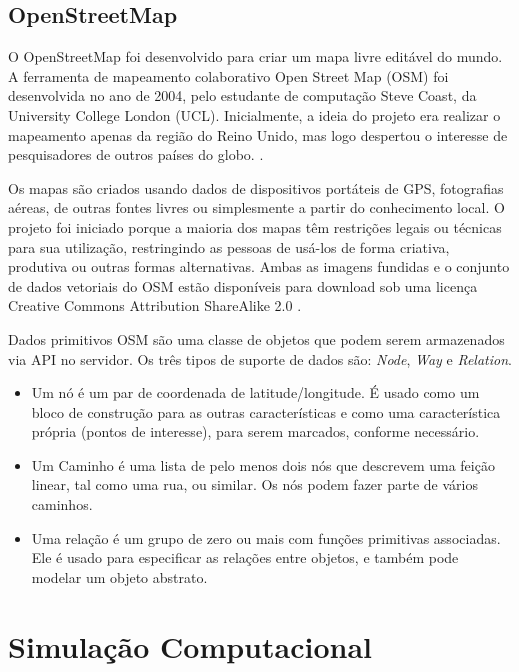 \subsection{OpenStreetMap}

O OpenStreetMap foi desenvolvido para criar um mapa livre editável do mundo. A ferramenta de mapeamento colaborativo Open Street Map (OSM) foi desenvolvida no ano de 2004, pelo estudante de computação Steve Coast, da University College London (UCL). Inicialmente, a ideia do projeto era realizar o mapeamento apenas da região do Reino Unido, mas logo despertou o interesse de pesquisadores de outros países do globo. \cite{ramm2011openstreetmap}.

Os mapas são criados usando dados de dispositivos portáteis de GPS, fotografias aéreas, de outras fontes livres ou simplesmente a partir do conhecimento local. O projeto foi iniciado porque a maioria dos mapas têm restrições legais ou técnicas para sua utilização, restringindo as pessoas de usá-los de forma criativa, produtiva ou outras formas alternativas. Ambas as imagens fundidas e o conjunto de dados vetoriais do OSM estão disponíveis para download sob uma licença Creative Commons Attribution ShareAlike 2.0 \cite{OpenStre2:online}.

Dados primitivos OSM são uma classe de objetos que podem serem armazenados via API no servidor. Os três tipos de suporte de dados são: \textit{Node}, \textit{Way} e \textit{Relation}. \cite{OpenStre2:online}

\begin{itemize}
\item Um nó é um par de coordenada de latitude/longitude. É usado como um bloco de construção para as outras características e como uma característica própria (pontos de interesse), para serem marcados, conforme necessário.
\item Um Caminho é uma lista de pelo menos dois nós que descrevem uma feição linear, tal como uma rua, ou similar. Os nós podem fazer parte de vários caminhos.
\item Uma relação é um grupo de zero ou mais com funções primitivas associadas. Ele é usado para especificar as relações entre objetos, e também pode modelar um objeto abstrato.
\end{itemize}

\section{Simulação Computacional}

